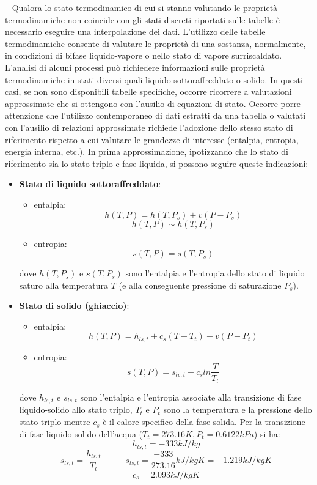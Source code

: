 \ \newline
Qualora lo stato termodinamico di cui si stanno valutando le proprietà termodinamiche non
coincide con gli stati discreti riportati sulle tabelle è necessario eseguire una interpolazione
dei dati.\newline
\newline
L’utilizzo delle tabelle termodinamiche consente di valutare le proprietà di una sostanza,
normalmente, in condizioni di bifase liquido-vapore o nello stato di vapore surriscaldato.
L’analisi di alcuni processi può richiedere informazioni sulle proprietà termodinamiche in
stati diversi quali liquido sottoraffreddato o solido. \newline
In questi casi, se non sono disponibili tabelle specifiche, occorre ricorrere a valutazioni
approssimate che si ottengono con l’ausilio di equazioni di stato. \newline
Occorre porre attenzione che l’utilizzo contemporaneo di dati estratti da una tabella o valutati
con l’ausilio di relazioni approssimate richiede l’adozione dello stesso stato di riferimento
rispetto a cui valutare le grandezze di interesse (entalpia, entropia, energia interna, etc.). \newline
In prima approssimazione, ipotizzando che lo stato di riferimento sia lo stato triplo e fase
liquida, si possono seguire queste indicazioni: 
\begin{itemize}
    \item \textbf{Stato di liquido sottoraffreddato}:
    \begin{itemize}
        \item entalpia: \[
            h(T,P) = h(T,P_s) + v (P-P_s)
        \]
        \[
            h(T,P) \sim h(T,P_s)
        \]
        \item entropia: \[
            s(T,P) = s(T,P_s)
        \]
    \end{itemize}
    dove $h(T,P_s)$ e $s(T,P_s)$ sono l'entalpia e l'entropia dello stato di liquido saturo alla temperatura $T$ (e alla conseguente pressione di saturazione $P_s$).
    \item \textbf{Stato di solido (ghiaccio)}:
    \begin{itemize}
        \item entalpia:\[
            h(T,P) = h_{ls,t} + c_s(T-T_t) + v(P-P_t)
        \]
        \item entropia:\[
            s(T,P) = s_{lv,t} +c_s ln \frac{T}{T_t}
        \]
    \end{itemize}
    dove $h_{ls,t}$ e $s_{ls,t}$ sono l'entalpia e l'entropia associate alla transizione di fase liquido-solido allo stato triplo, $T_t$ e $P_t$ sono la temperatura e la pressione dello stato triplo mentre $c_s$ è il calore specifico della fase solida.\newline
    Per la transizione di fase liquido-solido dell'acqua ($T_t = 273.16 K, P_t = 0.6122kPa$) si ha:
    \[
        h_{ls,t} = -333kJ/kg
    \]
    \[
        s_{ls,t} = \frac{h_{ls,t}}{T_t} \;\;\;\;\;\;\;\;\;\;s_{ls,t} = \frac{-333}{273.16}kJ/kgK = -1.219 kJ/kgK
    \]
    \[
        c_s = 2.093 kJ/kgK
    \]
\end{itemize}
